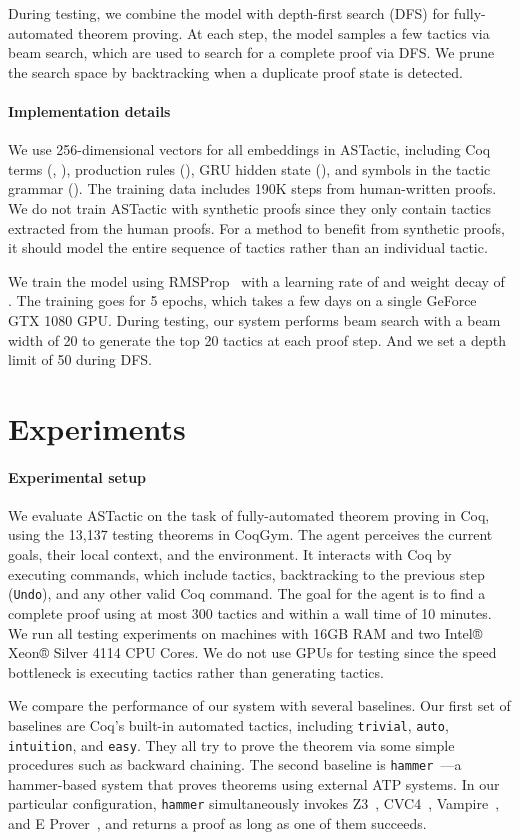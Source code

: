 \documentclass{article}
\newcommand{\smallsec}[1]{\vspace{-3mm} \paragraph{#1}}
\newcommand{\datasetname}{CoqGym}
\newcommand{\numberoftestproofs}{13,137 }
\newcommand{\numberofhumantrainvalidsteps}{190K }
\begin{document}
During testing, we combine the model with depth-first search (DFS) for fully-automated theorem proving.
At each step, the model samples a few tactics via beam search, which are used to search for a complete proof via DFS. We prune the search space by backtracking when a duplicate proof state is detected.


\smallsec{Implementation details}
We use 256-dimensional vectors for all embeddings in ASTactic, including Coq terms (, ),  production rules (), GRU hidden state (), and symbols in the tactic grammar ().
The training data includes \numberofhumantrainvalidsteps steps from human-written proofs. 
We do not train ASTactic with synthetic proofs since they only contain tactics extracted from the human proofs. For a method to benefit from synthetic proofs, it should model the entire sequence of tactics rather than an individual tactic.

We train the model using RMSProp~\citep{Tieleman2012} with a learning rate of  and weight decay of .
The training goes for 5 epochs, which takes a few days on a single GeForce GTX 1080 GPU. During testing, our system performs beam search with a beam width of 20 to generate the top 20 tactics at each proof step. And we set a depth limit of 50 during DFS.


\section{Experiments}

\vspace{2mm}

\smallsec{Experimental setup} We evaluate ASTactic on the task of fully-automated theorem proving in Coq, using the \numberoftestproofs testing theorems in \datasetname.
The agent perceives the current goals, their local context, and the environment.
It interacts with Coq by executing commands, which include tactics, backtracking to the previous step (\texttt{Undo}), and any other valid Coq command.
The goal for the agent is to find a complete proof using at most 300 tactics and within a wall time of 10 minutes.
We run all testing experiments on machines with 16GB RAM and two Intel® Xeon® Silver 4114 CPU Cores. 
We do not use GPUs for testing since the speed bottleneck is executing tactics rather than generating tactics.



We compare the performance of our system with several baselines. Our first set of baselines are Coq's built-in automated tactics, including \texttt{trivial}, \texttt{auto}, \texttt{intuition}, and \texttt{easy}. 
They all try to prove the theorem via some simple procedures such as backward chaining.
The second baseline is \texttt{hammer}~\citep{czajka2018hammer}---a hammer-based system that proves theorems using external ATP systems.
In our particular configuration, \texttt{hammer} simultaneously invokes Z3~\cite{de2008z3}, CVC4~\citep{BCD+11}, Vampire~\citep{kovacs2013first}, and E Prover~\citep{schulz2013system}, and returns a proof as long as one of them succeeds.
\end{document}
